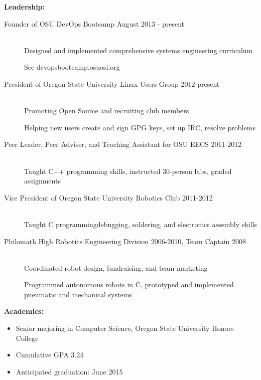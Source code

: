 \documentclass[11pt]{article}
\begin{document}
{\Large \bf Leadership:}
\begin{description}
    \item[Founder of OSU DevOps Bootcamp
        \hfill August 2013 - present]
        \hfill \\
        Designed and implemented comprehensive systems engineering curriculum

        See devopsbootcamp.osuosl.org

    \item[President of Oregon State University Linux Users Group
        \hfill 2012-present]
        \hfill \\
        Promoting Open Source and recruiting club members

        Helping new users create and sign GPG keys, set up IRC, resolve problems

    \item[Peer Leader, Peer Adviser, and Teaching Assistant for OSU EECS
        \hfill 2011-2012]
        \hfill \\
        Taught C++ programming skills, instructed 30-person labs, graded
        assignments
    \item[Vice President of Oregon State University Robotics Club
        \hfill 2011-2012]
        \hfill \\
        Taught C programming\/debugging, soldering, and electronics assembly skills

    \item[Philomath High Robotics Engineering Division
        \hfill 2006-2010, Team Captain 2008]
        \hfill \\
        Coordinated robot design, fundraising, and team marketing

        Programmed autonomous robots in C, prototyped and implemented
        pneumatic and mechanical systems

\end{description}

\smallskip
\hrulefill
\bigskip

{\Large \bf Academics:}
\begin{itemize}
    \item Senior majoring in Computer Science, Oregon State University
          Honors College

    \item Cumulative GPA 3.24

    \item Anticipated graduation: June 2015

\end{itemize}
\end{document}
